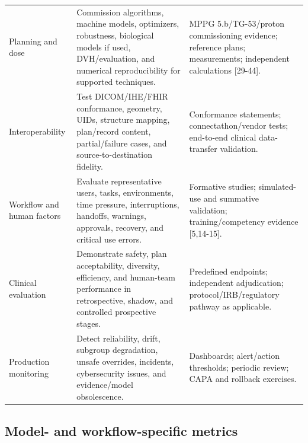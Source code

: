 \documentclass[11pt,letterpaper]{article}
\begin{document}
\begin{small}
\begin{longtable}{@{}L{0.1710\textwidth}L{0.3981\textwidth}L{0.3509\textwidth}@{}}
\addlinespace[2pt]
Planning and dose & Commission algorithms, machine models, optimizers, robustness, biological models if used, DVH\slash\allowbreak{}evaluation, and numerical reproducibility for supported techniques. & MPPG 5.b\slash\allowbreak{}TG-53\slash\allowbreak{}proton commissioning evidence; reference plans; measurements; independent calculations [29-44]. \\
\addlinespace[2pt]
Interoperability & Test DICOM\slash\allowbreak{}IHE\slash\allowbreak{}FHIR conformance, geometry, UIDs, structure mapping, plan\slash\allowbreak{}record content, partial\slash\allowbreak{}failure cases, and source-to-destination fidelity. & Conformance statements; connectathon\slash\allowbreak{}vendor tests; end-to-end clinical data-transfer validation. \\
\addlinespace[2pt]
Workflow and human factors & Evaluate representative users, tasks, environments, time pressure, interruptions, handoffs, warnings, approvals, recovery, and critical use errors. & Formative studies; simulated-use and summative validation; training\slash\allowbreak{}competency evidence [5,14-15]. \\
\addlinespace[2pt]
Clinical evaluation & Demonstrate safety, plan acceptability, diversity, efficiency, and human-team performance in retrospective, shadow, and controlled prospective stages. & Predefined endpoints; independent adjudication; protocol\slash\allowbreak{}IRB\slash\allowbreak{}regulatory pathway as applicable. \\
\addlinespace[2pt]
Production monitoring & Detect reliability, drift, subgroup degradation, unsafe overrides, incidents, cybersecurity issues, and evidence\slash\allowbreak{}model obsolescence. & Dashboards; alert\slash\allowbreak{}action thresholds; periodic review; CAPA and rollback exercises. \\
\end{longtable}
\end{small}

\subsection{Model- and workflow-specific metrics}
\end{document}
